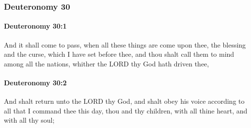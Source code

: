 	\subsubsection{Deuteronomy 30} %
		\label{DEUTERONOMY-30}

		\paragraph{Deuteronomy 30:1} %
			\label{DEUTERONOMY-30-1}

			And it shall come to pass, when all these things are come upon thee, the blessing and the curse, which I have set before thee, and thou shalt call them to mind among all the nations, whither the LORD thy God hath driven thee,


		\paragraph{Deuteronomy 30:2} %
			\label{DEUTERONOMY-30-2}

			And shalt return unto the LORD thy God, and shalt obey his voice according to all that I command thee this day, thou and thy children, with all thine heart, and with all thy soul;

